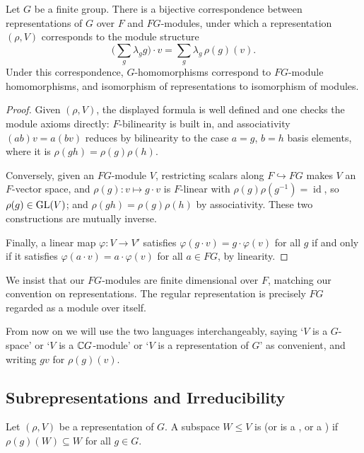 \documentclass[a4paper]{scrartcl}
\newcommand{\id}{\operatorname{id}}
\begin{document}
\begin{proposition}
	Let $G$ be a finite group. There is a bijective correspondence between representations of $G$ over $F$ and $FG$-modules, under which a representation $(\rho, V)$ corresponds to the module structure
	$$\Big(\sum_g \lambda_g g\Big) \cdot v = \sum_g \lambda_g\, \rho(g)(v).$$
	Under this correspondence, $G$-homomorphisms correspond to $FG$-module homomorphisms, and isomorphism of representations to isomorphism of modules.
\end{proposition}
\begin{proof}
	Given $(\rho, V)$, the displayed formula is well defined and one checks the module axioms directly: $F$-bilinearity is built in, and associativity $(ab)v = a(bv)$ reduces by bilinearity to the case $a = g$, $b = h$ basis elements, where it is $\rho(gh) = \rho(g)\rho(h)$.

	Conversely, given an $FG$-module $V$, restricting scalars along $F \hookrightarrow FG$ makes $V$ an $F$-vector space, and $\rho(g) : v \mapsto g \cdot v$ is $F$-linear with $\rho(g)\rho(g^{-1}) = \id$, so $\rho(g) \in \operatorname{GL}(V)$; and $\rho(gh) = \rho(g)\rho(h)$ by associativity. These two constructions are mutually inverse.

	Finally, a linear map $\varphi : V \to V'$ satisfies $\varphi(g \cdot v) = g\cdot \varphi(v)$ for all $g$ if and only if it satisfies $\varphi(a \cdot v) = a \cdot \varphi(v)$ for all $a \in FG$, by linearity.
\end{proof}

\begin{remark}
	We insist that our $FG$-modules are finite dimensional over $F$, matching our convention on representations. The regular representation is precisely $FG$ regarded as a module over itself.
\end{remark}

From now on we will use the two languages interchangeably, saying `$V$ is a $G$-space' or `$V$ is a $\mathbb{C} G$-module' or `$V$ is a representation of $G$' as convenient, and writing $gv$ for $\rho(g)(v)$.

\subsection{Subrepresentations and Irreducibility}

\begin{definition}[Subrepresentation]
	Let $(\rho, V)$ be a representation of $G$. A subspace $W \leq V$ is  (or is a , or a ) if $\rho(g)(W) \subseteq W$ for all $g \in G$.
\end{definition}
\end{document}
